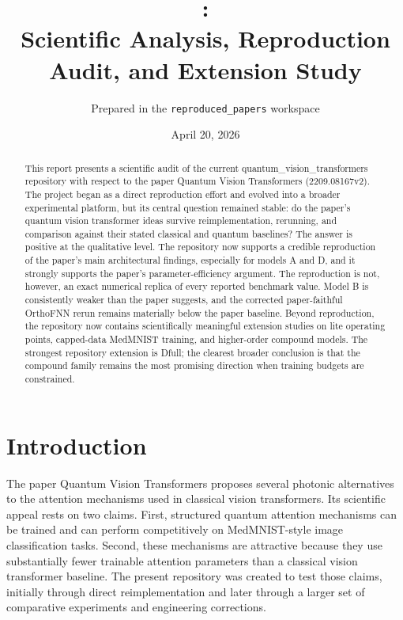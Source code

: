 \documentclass[11pt,a4paper]{article}
\title{\papertitle:\\Scientific Analysis, Reproduction Audit, and Extension Study}
\author{Prepared in the \texttt{reproduced\_papers} workspace}
\date{April 20, 2026}
\def\repo{quantum_vision_transformers}%
\def\papertitle{Quantum Vision Transformers}%
\def\texttt#1{#1}%
\def\_{}%
\newcommand{\repo}{\texttt{quantum\_vision\_transformers}}
\newcommand{\papertitle}{\textit{Quantum Vision Transformers}}
\begin{document}
\maketitle

\begin{abstract}
This report presents a scientific audit of the current \repo{} repository with respect to the paper \papertitle{} (\texttt{2209.08167v2}). The project began as a direct reproduction effort and evolved into a broader experimental platform, but its central question remained stable: do the paper's quantum vision transformer ideas survive reimplementation, rerunning, and comparison against their stated classical and quantum baselines? The answer is positive at the qualitative level. The repository now supports a credible reproduction of the paper's main architectural findings, especially for models \texttt{A} and \texttt{D}, and it strongly supports the paper's parameter-efficiency argument. The reproduction is not, however, an exact numerical replica of every reported benchmark value. Model \texttt{B} is consistently weaker than the paper suggests, and the corrected paper-faithful \texttt{OrthoFNN} rerun remains materially below the paper baseline. Beyond reproduction, the repository now contains scientifically meaningful extension studies on lite operating points, capped-data MedMNIST training, and higher-order compound models. The strongest repository extension is \texttt{D\_full}; the clearest broader conclusion is that the compound family remains the most promising direction when training budgets are constrained.
\end{abstract}

\tableofcontents
\clearpage

\section{Introduction}

The paper \papertitle{} proposes several photonic alternatives to the attention mechanisms used in classical vision transformers. Its scientific appeal rests on two claims. First, structured quantum attention mechanisms can be trained and can perform competitively on MedMNIST-style image classification tasks. Second, these mechanisms are attractive because they use substantially fewer trainable attention parameters than a classical vision transformer baseline. The present repository was created to test those claims, initially through direct reimplementation and later through a larger set of comparative experiments and engineering corrections.
\end{document}

